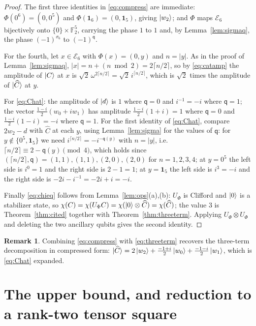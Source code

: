 \documentclass[11pt]{article}
\theoremstyle{plain}
\theoremstyle{definition}
\newtheorem{remark}[theorem]{Remark}
\newcommand{\F}{\mathbb{F}}
\newcommand{\qq}{\mathsf{q}}
\newcommand{\Ev}{\mathcal{E}}
\newcommand{\one}{\mathbf{1}}
\newcommand{\wt}[1]{\lvert #1\rvert}
\begin{document}
\begin{proof}
The first three identities in \eqref{eq:compress} are immediate:
$\Phi(0^6)=(0,0^5)$ and $\Phi(\one_6)=(0,\one_5)$, giving $\ket{w_2}$; and $\Phi$ maps
$\Ev_6$ bijectively onto $\{0\}\times\F_2^5$, carrying the phase $1$ to $1$ and, by
Lemma~\ref{lem:sigmaq}, the phase $(-1)^{\sigma_6}$ to $(-1)^{\qq}$.

For the fourth, let $x\in\Ev_6$ with $\Phi(x)=(0,y)$ and $n=\wt y$. As in the proof of
Lemma~\ref{lem:sigmaq}, $\wt x=n+(n\bmod2)=2\lceil n/2\rceil$, so by \eqref{eq:catamp}
the amplitude of $\ket C$ at $x$ is
$\sqrt2\,\omega^{2\lceil n/2\rceil}=\sqrt2\,i^{\lceil n/2\rceil}$, which is
$\sqrt2$ times the amplitude of $\ket{\widehat C}$ at $y$.

For \eqref{eq:Chat}: the amplitude of $\ket d$ is $1$ where $\qq=0$ and $i^{-1}=-i$
where $\qq=1$; the vector $\frac{1-i}2(w_0+iw_1)$ has amplitude
$\frac{1-i}2(1+i)=1$ where $\qq=0$ and $\frac{1-i}{2}(1-i)=-i$ where $\qq=1$. For the
first identity of \eqref{eq:Chat}, compare $2w_2-d$ with $\widehat C$ at each $y$,
using Lemma~\ref{lem:sigma} for the values of $\qq$:
for $y\notin\{0^5,\one_5\}$ we need $i^{\lceil n/2\rceil}=-i^{-\qq(y)}$ with $n=\wt y$, i.e.\
$\lceil n/2\rceil\equiv2-\qq(y)\pmod4$, which holds since
$(\lceil n/2\rceil,\qq)=(1,1),(1,1),(2,0),(2,0)$ for $n=1,2,3,4$; at $y=0^5$ the left
side is $i^0=1$ and the right side is $2-1=1$; at $y=\one_5$ the left side is
$i^3=-i$ and the right side is $-2i-i^{-1}=-2i+i=-i$.

Finally \eqref{eq:chieq} follows from Lemma~\ref{lem:ops}(a),(b): $U_\Phi$ is Clifford
and $\ket 0$ is a stabilizer state, so
$\chi(C)=\chi(U_\Phi C)=\chi(\ket0\otimes\widehat C)=\chi(\widehat C)$; the value $3$
is Theorem~\ref{thm:cited} together with Theorem~\ref{thm:threeterm}. Applying
$U_\Phi\otimes U_\Phi$ and deleting the two ancillary qubits gives the second identity.
\end{proof}

\begin{remark}
Combining \eqref{eq:compress} with \eqref{eq:threeterm} recovers the three-term
decomposition in compressed form:
$\ket{\widehat C}=2\ket{w_2}+\frac{-1+i}{2}\ket{w_0}+\frac{-1-i}{2}\ket{w_1}$, which is
\eqref{eq:Chat} expanded.
\end{remark}

\section{The upper bound, and reduction to a rank-two tensor square}\label{sec:upper}
\end{document}
